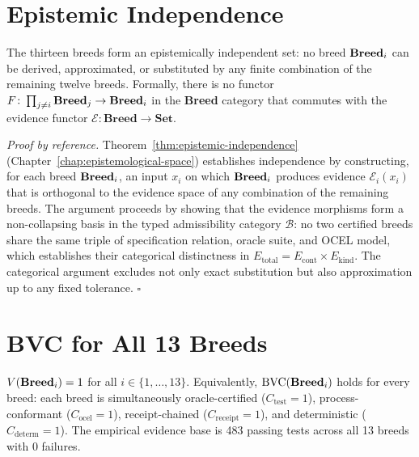 \section{Epistemic Independence}
\label{sec:thm-epistemic}

\begin{theorem}
\label{thm:main-epistemic}
The thirteen breeds form an epistemically independent set: no breed $\mathbf{Breed}_i$ can be
derived, approximated, or substituted by any finite combination of the remaining twelve
breeds. Formally, there is no functor $F \colon \prod_{j \neq i} \mathbf{Breed}_j \to \mathbf{Breed}_i$
in the \textbf{Breed} category that commutes with the evidence functor
$\mathcal{E} \colon \mathbf{Breed} \to \mathbf{Set}$.
\end{theorem}

\noindent\textit{Proof by reference.} Theorem~\ref{thm:epistemic-independence}
(Chapter~\ref{chap:epistemological-space}) establishes independence by constructing, for
each breed $\mathbf{Breed}_i$, an input $x_i$ on which $\mathbf{Breed}_i$ produces evidence
$\mathcal{E}_i(x_i)$ that is orthogonal to the evidence space of any combination of
the remaining breeds. The argument proceeds by showing that the evidence morphisms
form a non-collapsing basis in the typed admissibility category $\mathcal{B}$: no two
certified breeds share the same triple of specification relation, oracle suite, and OCEL
model, which establishes their categorical distinctness in
$E_{\mathrm{total}} = E_{\mathrm{cont}} \times E_{\mathrm{kind}}$.
The categorical argument excludes not only exact substitution but also approximation up to
any fixed tolerance. $\square$

\section{BVC for All 13 Breeds}
\label{sec:thm-bvc}

\begin{theorem}
\label{thm:main-bvc}
$V(\mathbf{Breed}_i) = 1$ for all $i \in \{1, \ldots, 13\}$. Equivalently, $\mathrm{BVC}(\mathbf{Breed}_i)$
holds for every breed: each breed is simultaneously oracle-certified
($C_{\mathrm{test}} = 1$), process-conformant ($C_{\mathrm{ocel}} = 1$), receipt-chained
($C_{\mathrm{receipt}} = 1$), and deterministic ($C_{\mathrm{determ}} = 1$). The
empirical evidence base is 483 passing tests across all 13 breeds with 0 failures.
\end{theorem}

